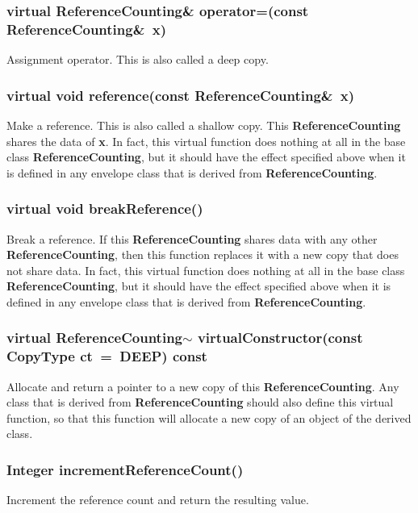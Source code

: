 \documentclass{article}
\begin{document}
  \subsubsection{virtual ReferenceCounting\& operator=(const ReferenceCounting\&~x)}
  \label{ReferenceCounting::operator=(x)}
    Assignment operator.  This is also called a deep copy.

  \subsubsection{virtual void reference(const ReferenceCounting\&~x)}
  \label{ReferenceCounting::reference(ReferenceCounting)}
    Make a reference.  This is also called a shallow copy.  This \textbf{ReferenceCounting} shares the data of \textbf{x}.
    In fact, this virtual function does nothing at all in the base class \textbf{ReferenceCounting}, but it should
    have the effect specified above when it is defined in any envelope class that is derived from \textbf{ReferenceCounting}.

  \subsubsection{virtual void breakReference()}
  \label{ReferenceCounting::breakReference()}
    Break a reference.  If this \textbf{ReferenceCounting} shares data with any other \textbf{ReferenceCounting},
    then this function replaces it with a new copy that does not share data.
    In fact, this virtual function does nothing at all in the base class \textbf{ReferenceCounting}, but it should
    have the effect specified above when it is defined in any envelope class that is derived from \textbf{ReferenceCounting}.

  \subsubsection{virtual ReferenceCounting$\sim$ virtualConstructor(const CopyType ct~=~DEEP) const}
  \label{ReferenceCounting::virtualConstructor(ct) const}
    Allocate and return a pointer to a new copy of this \textbf{ReferenceCounting}.  Any class that is derived from
    \textbf{ReferenceCounting} should also define this virtual function, so that this function will allocate a new
    copy of an object of the derived class.

  \subsubsection{Integer incrementReferenceCount()}
  \label{ReferenceCounting::incrementReferenceCount()}
    Increment the reference count and return the resulting value.
\end{document}
